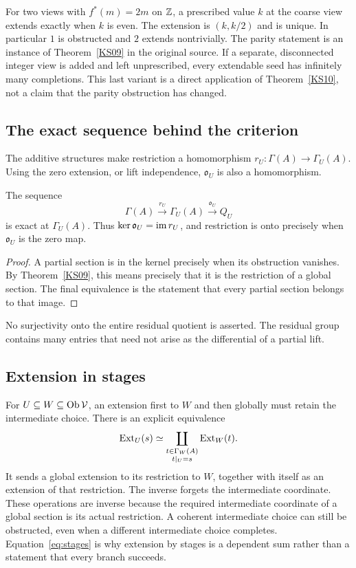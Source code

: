 \begin{example}
For two views with \(f^*(m)=2m\) on \(\mathbb Z\), a prescribed value \(k\) at the coarse view extends exactly when \(k\) is even. The extension is \((k,k/2)\) and is unique. In particular \(1\) is obstructed and \(2\) extends nontrivially. The parity statement is an instance of Theorem~\ref{KS09} in the original source. If a separate, disconnected integer view is added and left unprescribed, every extendable seed has infinitely many completions. This last variant is a direct application of Theorem~\ref{KS10}, not a claim that the parity obstruction has changed.
\end{example}

\subsection{The exact sequence behind the criterion}
The additive structures make restriction a homomorphism
\(r_U:\Gamma(A)\to\Gamma_U(A)\). Using the zero extension, or lift independence, \(\mathfrak o_U\) is also a homomorphism.

\begin{proposition}\label{KS12}
The sequence
\[
 \Gamma(A)\xrightarrow{r_U}\Gamma_U(A)
 \xrightarrow{\mathfrak o_U}Q_U
\]
is exact at \(\Gamma_U(A)\). Thus \(\ker\mathfrak o_U=\operatorname{im} r_U\), and restriction is onto precisely when \(\mathfrak o_U\) is the zero map.
\end{proposition}
\begin{proof}
A partial section is in the kernel precisely when its obstruction vanishes. By Theorem~\ref{KS09}, this means precisely that it is the restriction of a global section. The final equivalence is the statement that every partial section belongs to that image.
\end{proof}
No surjectivity onto the entire residual quotient is asserted. The residual group contains many entries that need not arise as the differential of a partial lift.

\subsection{Extension in stages}
For \(U\subseteq W\subseteq\operatorname{Ob}\mathcal V\), an extension first to \(W\) and then globally must retain the intermediate choice. There is an explicit equivalence
\begin{equation}\label{eq:stages}
 \operatorname{Ext}_U(s)\simeq
 \coprod_{\substack{t\in\Gamma_W(A)\\t|_U=s}}\operatorname{Ext}_W(t).
\end{equation}
It sends a global extension to its restriction to \(W\), together with itself as an extension of that restriction. The inverse forgets the intermediate coordinate. These operations are inverse because the required intermediate coordinate of a global section is its actual restriction. A coherent intermediate choice can still be obstructed, even when a different intermediate choice completes. Equation~\eqref{eq:stages} is why extension by stages is a dependent sum rather than a statement that every branch succeeds.

